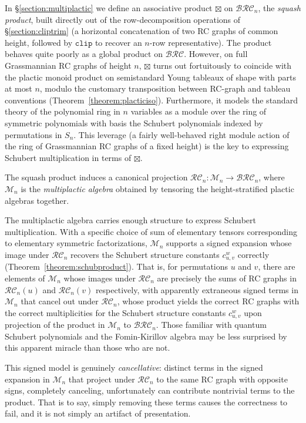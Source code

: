 \documentclass[pdflatex,sn-mathphys-num]{sn-jnl}
\numberwithin{equation}{subsection}
\newcommand{\clp}{\mathtt{clip}}
\newcommand{\BRC}{\mathcal{BRC}}
\newcommand{\RC}{\mathcal{RC}}
\theoremstyle{thmstyleone}
\theoremstyle{thmstylethree}
\theoremstyle{thmstyletwo}
\begin{document}
In \S\ref{section:multiplactic} we define an associative product $\boxtimes$ on $\BRC_n$, the \emph{squash product}, built directly out of the row-decomposition operations of \S\ref{section:cliptrim} (a horizontal concatenation of two RC graphs of common height, followed by $\clp$ to recover an $n$-row representative). The product behaves quite poorly as a global product on $\BRC$. However, on full Grassmannian RC graphs of height $n$, $\boxtimes$ turns out fortuitously to coincide with the plactic monoid product on semistandard Young tableaux of shape with parts at most $n$, modulo the customary transposition between RC-graph and tableau conventions (Theorem~\ref{theorem:placticiso}). Furthermore, it models the standard theory of the polynomial ring in $n$ variables as a module over the ring of symmetric polynomials with basis the Schubert polynomials indexed by permutations in $S_n$. This leverage (a fairly well-behaved right module action of the ring of Grassmannian RC graphs of a fixed height) is the key to expressing Schubert multiplication in terms of $\boxtimes$. 

The squash product induces a canonical projection $\RC_n:\mathcal{M}_n\to\BRC_n$, where $\mathcal{M}_n$ is the \emph{multiplactic algebra} obtained by tensoring the height-stratified plactic algebras together.

The multiplactic algebra carries enough structure to express Schubert multiplication. With a specific choice of sum of elementary tensors corresponding to elementary symmetric factorizations, $\mathcal{M}_n$ supports a signed expansion whose image under $\RC_n$ recovers the Schubert structure constants $c_{u,v}^w$ correctly (Theorem~\ref{theorem:schubproduct}). That is, for permutations $u$ and $v$, there are elements of $\mathcal{M}_n$ whose images under $\RC_n$ are precisely the sums of RC graphs in $\RC_n(u)$ and $\RC_n(v)$ respectively, with apparently extraneous signed terms in $\mathcal{M}_n$ that cancel out under $\RC_n$, whose product yields the correct RC graphs with the correct multiplicities for the Schubert structure constants $c_{u,v}^w$ upon projection of the product in $\mathcal{M}_n$ to $\BRC_n$. Those familiar with quantum Schubert polynomials and the Fomin-Kirillov algebra may be less surprised by this apparent miracle than those who are not.


This signed model is genuinely \emph{cancellative}: distinct terms in the signed expansion in $\mathcal{M}_n$ that project under $\RC_n$ to the same RC graph with opposite signs, completely canceling, unfortunately can contribute nontrivial terms to the product. That is to say, simply removing these terms causes the correctness to fail, and it is not simply an artifact of presentation.
\end{document}
